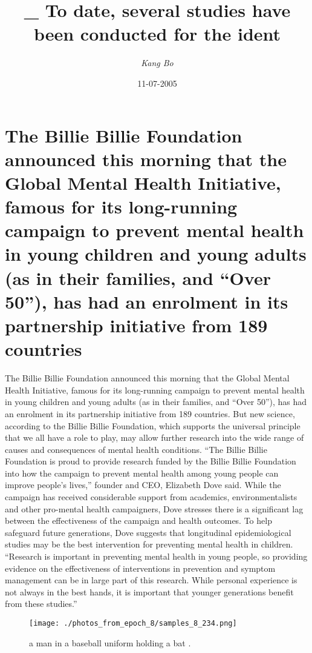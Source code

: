 \documentclass{article}%
\title{\_ To date, several studies have been conducted for the ident}%
\author{\textit{Kang Bo}}%
\date{11-07-2005}%
\begin{document}
%
\normalsize%
\maketitle%
\section{The Billie Billie Foundation announced this morning that the Global Mental Health Initiative, famous for its long{-}running campaign to prevent mental health in young children and young adults (as in their families, and “Over 50”), has had an enrolment in its partnership initiative from 189 countries}%
\label{sec:TheBillieBillieFoundationannouncedthismorningthattheGlobalMentalHealthInitiative,famousforitslong{-}runningcampaigntopreventmentalhealthinyoungchildrenandyoungadults(asintheirfamilies,andOver50),hashadanenrolmentinitspartnershipinitiativefrom189countries}%
The Billie Billie Foundation announced this morning that the Global Mental Health Initiative, famous for its long{-}running campaign to prevent mental health in young children and young adults (as in their families, and “Over 50”), has had an enrolment in its partnership initiative from 189 countries.\newline%
But new science, according to the Billie Billie Foundation, which supports the universal principle that we all have a role to play, may allow further research into the wide range of causes and consequences of mental health conditions.\newline%
“The Billie Billie Foundation is proud to provide research funded by the Billie Billie Foundation into how the campaign to prevent mental health among young people can improve people’s lives,” founder and CEO, Elizabeth Dove said.\newline%
While the campaign has received considerable support from academics, environmentalists and other pro{-}mental health campaigners, Dove stresses there is a significant lag between the effectiveness of the campaign and health outcomes.\newline%
To help safeguard future generations, Dove suggests that longitudinal epidemiological studies may be the best intervention for preventing mental health in children.\newline%
“Research is important in preventing mental health in young people, so providing evidence on the effectiveness of interventions in prevention and symptom management can be in large part of this research. While personal experience is not always in the best hands, it is important that younger generations benefit from these studies.”\newline%

%


\begin{figure}[h!]%
\centering%
\texttt{[image: ./photos\_from\_epoch\_8/samples\_8\_234.png]}%
\caption{a man in a baseball uniform holding a bat .}%
\end{figure}

%
\end{document}
